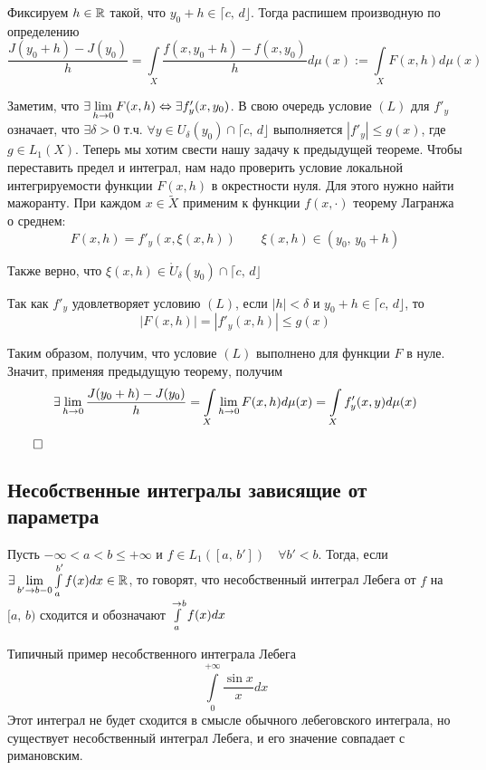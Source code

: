 \proof Фиксируем $h \in \mathbb{R}$ такой, что $y_0 + h \in \lceil c, \, d \rfloor$. Тогда распишем производную по определению
$$\frac{J(y_0 + h) - J(y_0)}{h} = \int\limits_X \frac{f(x, y_0 + h) - f(x, y_0)}{h} d \mu(x) := \int\limits_X F(x, h) d \mu(x)$$

Заметим, что $\exists \lim\limits_{h \rightarrow 0} F(x, h) \Leftrightarrow \exists f'_y(x, y_0)$. В свою очередь условие $(L)$ для $f'_y$ означает, что $\exists \delta > 0$ т.ч. $\forall y \in U_\delta(y_0) \cap \lceil c, \, d \rfloor$ выполняется $\left| f'_y \right| \leq g(x)$, где $g \in L_1(X)$. Теперь мы хотим свести нашу задачу к предыдущей теореме. Чтобы переставить предел и интеграл, нам надо проверить условие локальной интегрируемости функции $F(x, h)$ в окрестности нуля. Для этого нужно найти мажоранту. При каждом $x \in \widetilde{X}$ применим к функции $f(x, \cdot)$ теорему Лагранжа о среднем:
$$F(x, h) = f'_y(x, \xi(x, h)) \qquad \xi(x, h) \in (y_0, \, y_0 + h)$$

Также верно, что $\xi(x, h) \in \mathring{U}_\delta(y_0) \cap \lceil c, \, d \rfloor$

Так как $f'_y$ удовлетворяет условию $(L)$, если $|h| < \delta$ и $y_0 + h \in \lceil c, \, d \rfloor$, то
$$\left| F(x, h)\right| = |f'_y(x, h)| \leq g(x)$$

Таким образом, получим, что условие $(L)$ выполнено для функции $F$ в нуле. Значит, применяя предыдущую теорему, получим
$$\exists \lim\limits_{h \rightarrow 0} \frac{J(y_0 + h) - J(y_0)}{h} = \int\limits_X \lim\limits_{h \rightarrow 0} F(x, h) d \mu (x) = \int\limits_X f'_y(x, y) d \mu(x)$$

$\qed$

\subsection{Несобственные интегралы зависящие от параметра}

 Пусть $- \infty < a < b \leq + \infty$ и $f \in L_1([a, \, b']) \quad \forall b' < b$. Тогда, если $\exists \lim \limits_{b' \rightarrow b - 0} \int\limits^{b'}_a f(x) dx \in \mathbb{R}$, то говорят, что несобственный интеграл Лебега от $f$ на $[a, \, b)$ сходится и обозначают $\int\limits^{\rightarrow b}_a f(x)dx$

\remark Типичный пример несобственного интеграла Лебега
$$\int\limits^{+\infty}_0 \frac{\sin x}{x} d x$$
Этот интеграл не будет сходится в смысле обычного лебеговского интеграла, но существует несобственный интеграл Лебега, и его значение совпадает с римановским.

